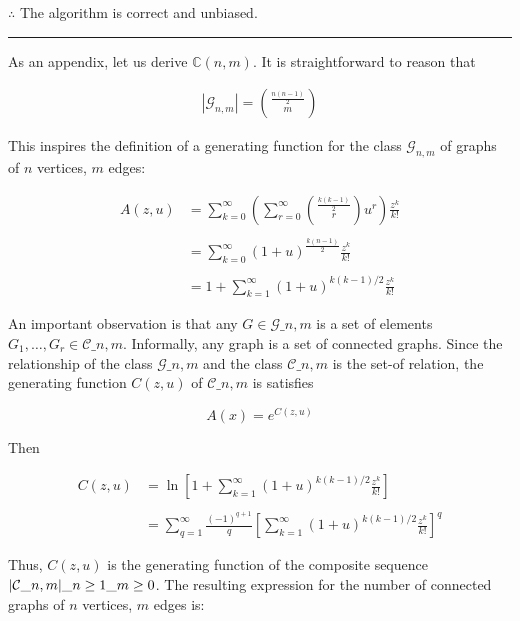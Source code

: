 \documentclass[
]{article}
\begin{document}
\(\therefore\) The algorithm is correct and unbiased.

\begin{center}\rule{0.5\linewidth}{0.5pt}\end{center}

As an appendix, let us derive \(\mathbb{C}(n,m)\). It is straightforward
to reason that

\[
\begin{align*}
    |\mathcal{G}_{n,m}| = \binom{\frac{n(n-1)}{2}}{m}
\end{align*}
\]

This inspires the definition of a generating function for the class
\(\mathcal{G}_{n, m}\) of graphs of \(n\) vertices, \(m\) edges:

\[
\begin{align*}
    A(z, u) &= \sum_{k=0}^{\infty}\left(\sum_{r = 0}^{\infty} \binom{\frac{k(k-1)}{2}}{r}  u^r\right) \frac{z^k}{k!}\\\\
                                                               &=\sum_{k=0}^{\infty}(1 + u)^{\frac{k(n-1)}{2}} \frac{z^k}{k!} \\\\
                                                               &= 1 + \sum_{k=1}^{\infty} (1+u)^{k(k-1)/2} \frac{z^k}{k!}
\end{align*}
\]

An important observation is that any \(G \in \mathcal{G}\_{n,m}\) is a
set of elements \(G_1, \ldots, G_r \in \mathcal{C}\_{n, m}\).
Informally, any graph is a set of connected graphs. Since the
relationship of the class \(\mathcal{G}\_{n, m}\) and the class
\(\mathcal{C}\_{n, m}\) is the set-of relation, the generating function
\(C(z, u)\) of \(\mathcal{C}\_{n,m}\) is satisfies

\[A(x) = e^{C(z, u)}    \]

Then

\[
\begin{align*}
    C(z, u) &= \ln \left[1 + \sum_{k=1}^{\infty} (1+u)^{k(k-1)/2} \frac{z^k}{k!}\right] \\\\
    &= \sum_{q=1}^{\infty} \frac{ (-1)^{q+1} }{q} \left[ \sum_{k=1}^{\infty}\left( 1+u \right)^{k (k-1) / 2} \frac{z^k}{k!}  \right]^{q} 
\end{align*}
\]

Thus, \(C(z, u)\) is the generating function of the composite sequence
\(\\{\\{|\mathcal{C}\_{n, m}|\\}\_{n\geq 1}\\}\_{m\geq 0}\). The
resulting expression for the number of connected graphs of \(n\)
vertices, \(m\) edges is:
\end{document}
